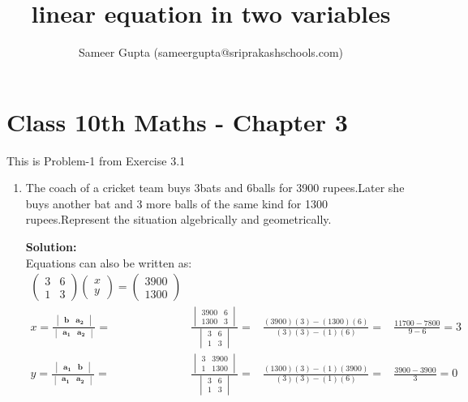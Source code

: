 \documentclass[12pt]{article}
\title{linear equation in two variables}
\author{Sameer Gupta (sameergupta@sriprakashschools.com)}
\newcommand{\myvec}[1]{\ensuremath{\begin{pmatrix}#1\end{pmatrix}}}
\newcommand{\mydet}[1]{\ensuremath{\begin{vmatrix}#1\end{vmatrix}}}
\newcommand{\solution}{\noindent \textbf{Solution: }}
\let\vec\mathbf
\begin{document}
\maketitle
\section*{Class 10th  Maths - Chapter 3}
This is Problem-1 from Exercise 3.1
\begin{enumerate}
\item The coach of a cricket team buys 3bats and 6balls for 3900 rupees.Later she buys another bat and 3 more balls of the same kind for 1300 rupees.Represent the situation algebrically and geometrically.

\solution\\
            Equations  can also be written as:\\     
\begin{align}
\myvec{3&6\\1&3}\myvec{x\\y} = \myvec{3900\\1300}\\
x=\frac{\mydet{ \vec{b} & \vec{a_2}}}{\mydet{ \vec{a_1} &\vec{a_2} }} =&
\frac{\mydet{ 3900 & 6 \\ 1300 & 3 }}{\mydet{3&6\\1&3}} =&
\frac{(3900)(3)-(1300)(6)}{(3)(3)-(1)(6)} =&
\frac{11700-7800}{9-6} =3  \\
y=\frac{\mydet{\vec{a_1}&\vec{b}}}{\mydet{\vec{a_1}&\vec{a_2}}} =&
\frac{\mydet{3&3900\\1&1300}}{\mydet{3&6\\1&3}} =&
\frac{(1300)(3)-(1)(3900)}{(3)(3)-(1)(6)} =&
\frac{3900-3900}{3} = 0\\
\end{align}

\end{enumerate}
\end{document}
